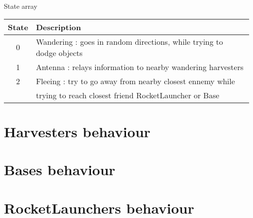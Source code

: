 \documentclass{article}
\begin{document}
\begin{table}[ht]
	State array\\
	\begin{tabular}{|c|l|}
		\hline
		State & Description \\
		\hline
		0 & Wandering : goes in random directions, while trying to dodge objects\\
		\hline
		1 & Antenna : relays information to nearby wandering harvesters\\
		\hline
		2 & Fleeing : try to go away from nearby closest ennemy while\\
		& trying to reach closest friend RocketLauncher or Base\\
		\hline
	\end{tabular}
\end{table}

\section{Harvesters behaviour}

\section{Bases behaviour}

\section{RocketLaunchers behaviour}
\end{document}
